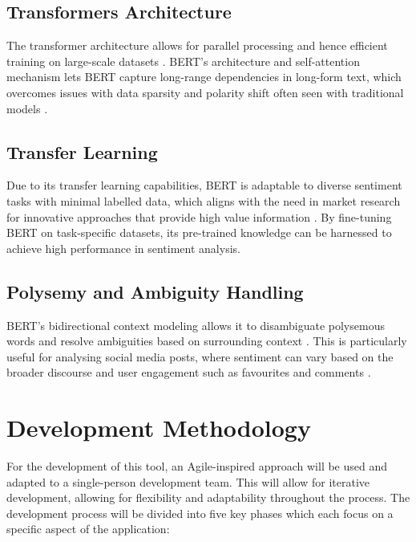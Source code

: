     \subsection{Transformers Architecture}
    The transformer architecture allows for parallel processing and hence efficient training on large-scale datasets \citep{kansara2020comparison}. BERT's architecture and self-attention mechanism lets BERT capture long-range dependencies in long-form text, which overcomes issues with data sparsity and polarity shift often seen with traditional models \citep{abirami2017survey, kamruzzaman2021comparative}.

    \subsection{Transfer Learning}
    Due to its transfer learning capabilities, BERT is adaptable to diverse sentiment tasks with minimal labelled data, which aligns with the need in market research for innovative approaches that provide high value information \citep{vikram2020use, gerdes2008integrative}. By fine-tuning BERT on task-specific datasets, its pre-trained knowledge can be harnessed to achieve high performance in sentiment analysis.

    \subsection{Polysemy and Ambiguity Handling}
    BERT's bidirectional context modeling allows it to disambiguate polysemous words and resolve ambiguities based on surrounding context \citep{zhou2016linguistic}. This is particularly useful for analysing social media posts, where sentiment can vary based on the broader discourse and user engagement such as favourites and comments \citep{mostafa2013more, lange2011people}.

\section{Development Methodology}
For the development of this tool, an Agile-inspired approach will be used and adapted to a single-person development team. This will allow for iterative development, allowing for flexibility and adaptability throughout the process. The development process will be divided into five key phases which each focus on a specific aspect of the application:

